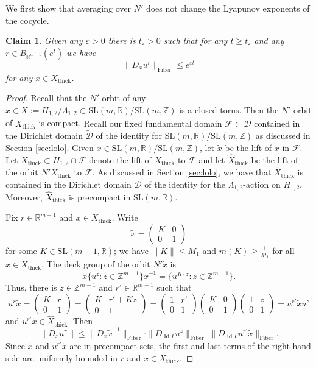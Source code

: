 \documentclass[10pt,reqno]{amsart}
\theoremstyle{Theorem}
\newtheorem{claim}[theorem]{Claim}
\theoremstyle{definition}
\theoremstyle{remark}
\newcommand{\note}[1]{\marginpar{{\color{red}\footnotesize \begin{spacing}{1}#1\end{spacing}}}}
\renewcommand{\epsilon}{\varepsilon}
\newcommand{\td}{\tilde}
\newcommand{\wtd}{\widetilde}
\def\Fib{\mathrm{Fiber}}
\DeclareMathOperator{\Id}{Id}
\newcommand{\R}{\mathbb {R}}
\newcommand{\Z}{\mathbb {Z}}
\newcommand{\e}{\epsilon}
\newcommand{\Xt}{X_{\mathrm{thick}}}
\newcommand{\Sl}{\mathrm{SL}}
\newcommand{\inv}{^{-1}}
\def\calF{\mathcal F}
\def\red{\color{red}}
\def\blue{}
\begin{document}
{We first show that averaging over $N'$ does not change the Lyapunov exponents of the cocycle.

\begin{claim}\label{siegelunipotent} Given any $\e> 0$ there is $t_{\e}>0$ such that for any $t \geq t_{\e}$ and any $r \in B_{\R^{m-1}}(e^{t})$ we have  $$\| {D_{x}u^r}\|_{\Fib} \leq e^{\e t}$$ %
for any $x\in \Xt$.
\end{claim}
\begin{proof}
 Recall that the $N'$-orbit of any $x\in X:= H_{1,2}/\Lambda_{1,2}\subset \Sl(m,\R)/\Sl(m,\Z)$ is a closed torus.    Then the $N'$-orbit of $\Xt$ is compact.
{\blue Recall our fixed fundamental domain $\calF\subset \wtd {\mathcal D}$ contained in the Dirichlet  domain  $\wtd {\mathcal D}$ of the identity for $\Sl(m,\R)/\Sl(m,\Z)$ as discussed in Section \ref{sec:lolo}.} Given $x\in  \Sl(m,\R)/\Sl(m,\Z)$, let $\td x$ be the lift of $x$ in $\calF$.  Let  $\wtd X _{\mathrm{thick}}\subset H_{1,2}\cap \calF$ denote the lift of $\Xt$ to  $\calF$ and let $\hat X _{\mathrm{thick}}$ be the lift of the orbit $N'\Xt$ to $\calF$.  {\blue As discussed in Section \ref{sec:lolo}, we have that $\wtd X _{\mathrm{thick}}$ is contained in the Dirichlet domain $\mathcal D$ of the identity for the  $\Lambda_{1,2}$-action on $H_{1,2}$.  Moreover, $\hat X _{\mathrm{thick}}$ is precompact in $\Sl(m,\R)$.}

Fix $r\in \R^{m-1}$ and $x\in \Xt$.   Write $$\td x = \left(\begin{array}{cc}K& 0 \\0 & 1\end{array}\right)$$ for some $K\in \Sl(m-1, \R)$; we have $\|K\|\le M_1$ and $m(K) \ge \frac 1 {M_1}$ for all $x\in \Xt$.     The deck group of the orbit $N'\td x$ is $$\td x   \{ u^z : z\in \Z^{m-1}\} \td x\inv = \{  u^{K\cdot z} : z\in \Z^{m-1}\} .$$  Thus, there is $z\in \Z^{m-1}$ and $r'\in \R^{m-1}$ such that
$$u^r \td x = \left(\begin{array}{cc}K& r \\0 & 1\end{array}\right)= \left(\begin{array}{cc}K& r' +K z\\0 & 1\end{array}\right)= \left(\begin{array}{cc}1& r' \\0 & 1\end{array}\right) \left(\begin{array}{cc}K& 0\\0 & 1\end{array}\right) \left(\begin{array}{cc}1& z \\0 & 1\end{array}\right) = u^{r'} \td x u^z$$
and $u^{r'} \td x\in \hat X _{\mathrm{thick}}$.
Then
$$\|D_{x}u^r\|\le \|D_{x}\td x\inv \| _{\Fib} \cdot  \| D_{\Id \Gamma} u^z\| _{\Fib}  \cdot \| D_{\Id\Gamma} u^{r'}\td x\| _{\Fib}.$$
Since $\td x$ and $ u^{r'}\td x$ are in precompact sets, the first and last terms of the right hand side are uniformly bounded in $r$ and $x\in \Xt$.


\end{proof}}
\end{document}

